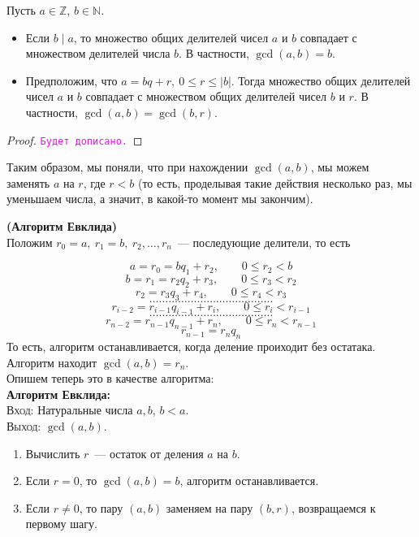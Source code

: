 \documentclass[11pt]{article}
\begin{document}
	\begin{lemma}\label{EuclidAlgorithmLemma}  Пусть $a \in \mathbb{Z}$, $b \in \mathbb{N}$.
		\begin{itemize}

			\item Если $b \mid a$, то множество общих делителей чисел $a$ и $b$ совпадает с множеством
			делителей числа $b$. В частности, $\gcd(a, b) = b$.

			\item Предположим, что $a = bq + r, \ 0 \le r \le |b|$. Тогда множество общих делителей чисел $a$ и $b$ совпадает с множеством
				  общих делителей чисел $b$ и $r$. В частности, $\gcd(a, b) = \gcd(b, r)$.
		\end{itemize}

	\end{lemma}
	\begin{proof}
		\textcolor{magenta}{\texttt{Будет дописано.}}
	\end{proof}
	Таким образом, мы поняли, что при нахождении $\gcd(a, b)$, мы можем заменять $a$ на $r$, где $r < b$ (то есть, проделывая
	такие действия несколько раз, мы уменьшаем числа, а значит, в какой-то момент мы закончим).
	\begin{theorem}\textbf{(Алгоритм Евклида)}\label{EuclidAlgo}\\
		Положим $r_0 = a, \ r_1 = b, \ r_2, \ldots, r_n$~--- последующие делители, то есть

		\[	a = r_0 = b q_1 + r_2, \qquad 0 \le r_2 < b  \]
		\[	b = r_1 = r_2 q_2 + r_3, \qquad 0 \le r_3 < r_2 \]
		\[	r_2 = r_3 q_3 + r_4, \qquad 0 \le r_4 < r_3 \]
		\[	\ldots \ldots \ldots \ldots \ldots \ldots \ldots \ldots \ldots \ldots \ldots \ldots \ldots  \]
		\[	r_{i - 2} = r_{i - 1} q_{i - 1} + r_{i}, \qquad 0 \le r_{i} < r_{i - 1} \]
		\[	\ldots \ldots \ldots \ldots \ldots \ldots \ldots \ldots \ldots \ldots \ldots \ldots \ldots \]
		\[	r_{n - 2} = r_{n - 1} q_{n - 1} + r_{n}, \qquad 0 \le r_n < r_{n - 1} \]
		\[	r_{n - 1} = r_n q_{n} \]
	То есть, алгоритм останавливается, когда деление проиходит без остатака. Алгоритм находит $\gcd(a, b) = r_n$.\\
	Опишем теперь это в качестве алгоритма:\\
	\textbf{Алгоритм Евклида:}\\
	\textsc{Вход:} Натуральные числа $a, b$, $b < a$.\\
	\textsc{Выход:} $\gcd(a, b)$.
	\begin{enumerate}

		\item Вычислить $r$~--- остаток  от деления $a$ на $b$.

		\item Если $r = 0$, то $\gcd(a, b) = b$, алгоритм останавливается.

		\item Если $r \neq 0$, то пару $(a, b)$ заменяем на пару $(b, r)$, возвращаемся к первому шагу.

	\end{enumerate}
	\end{theorem}
\end{document}
